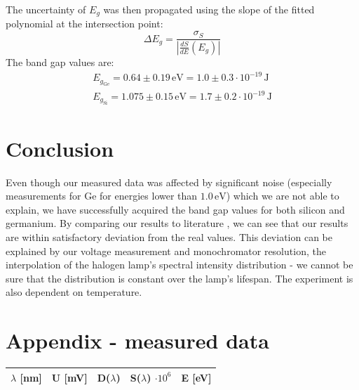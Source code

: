 \documentclass[english,11pt,a4paper]{article}
\begin{document}
\begin{multicols}{2}
		The uncertainty of $E_g$ was then propagated using the slope of the fitted polynomial at the intersection point:
		\[
		\Delta E_g = \frac{\sigma_S}{\left| \frac{dS}{dE}(E_g) \right|}
		\]
		The band gap values are:
		\begin{gather*}
			E_{g_\mathrm{Ge}} = 0.64 \pm 0.19\,\mathrm{eV} = 1.0 \pm 0.3 \cdot 10^{-19}  \,\mathrm{J}\\
			E_{g_\mathrm{Si}} = 1.075 \pm 0.15 \,\mathrm{eV} = 1.7 \pm 0.2 \cdot 10^{-19} \,\mathrm{J}
		\end{gather*}
	
		\section{Conclusion}
		Even though our measured data was affected by significant noise (especially measurements for Ge for energies lower than $1.0\, \mathrm{eV}$) which we are not able to explain, we have successfully acquired the band gap values for both silicon and germanium. By comparing our results to literature \cite{NIST}, we can see that our results are within satisfactory deviation from the real values. This deviation can be explained by our voltage measurement and monochromator resolution, the interpolation of the halogen lamp's spectral intensity distribution - we cannot be sure that the distribution is constant over the lamp's lifespan. The experiment is also dependent on temperature.
	

		\section{Appendix - measured data}
		
		\begin{table}[H]
			\begin{tabular}{rr|rrr}
				\hline
				$\lambda$ [nm] & U [mV] & D($\lambda$) & S($\lambda$) $\cdot 10^6$ & E [eV] \\
				\hline
				

\end{tabular}
\end{table}
\end{multicols}
\end{document}

